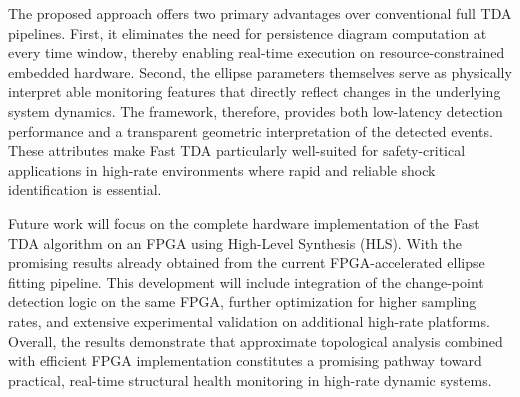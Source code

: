 \documentclass[colorlinks,upint,subscriptcorrection,varvw,hyphenate,balance,greek,russian,vietnamese,german]{asmeconf} %
\begin{document}
The proposed approach offers two primary advantages over conventional full TDA pipelines. First, it eliminates the need for persistence diagram computation at every time window, thereby enabling real-time execution on resource-constrained embedded hardware. Second, the ellipse parameters themselves serve as physically interpret able monitoring features that directly reflect changes in the underlying system dynamics. The framework, therefore, provides both low-latency detection performance and a transparent geometric interpretation of the detected events. These attributes make Fast TDA particularly well-suited for safety-critical applications in high-rate environments where rapid and reliable shock identification is essential.

Future work will focus on the complete hardware implementation of the Fast TDA algorithm on an FPGA using High-Level Synthesis (HLS). With the promising results already obtained from the current FPGA-accelerated ellipse fitting pipeline. This development will include integration of the change-point detection logic on the same FPGA, further optimization for higher sampling rates, and extensive experimental validation on additional high-rate platforms. Overall, the results demonstrate that approximate topological analysis combined with efficient FPGA implementation constitutes a promising pathway toward practical, real-time structural health monitoring in high-rate dynamic systems.







\end{document}
